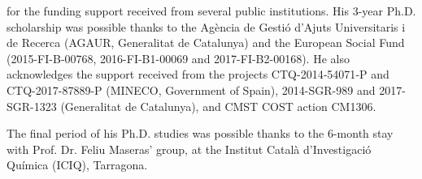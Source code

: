 
 for the funding support received from several public institutions. His 3-year Ph.D. scholarship was possible thanks to the Agència de Gestió d'Ajuts Universitaris i de Recerca (AGAUR, Generalitat de Catalunya) and the European Social Fund (2015-FI-B-00768, 2016-FI-B1-00069 and 2017-FI-B2-00168). He also acknowledges the support received from the projects CTQ-2014‐54071‐P and CTQ-2017-87889-P (MINECO, Government of Spain), 2014-SGR-989 and 2017-SGR-1323 (Generalitat de Catalunya), and CMST COST action CM1306.

The final period of his Ph.D. studies was possible thanks to the 6-month stay with Prof. Dr. Feliu Maseras' group, at the Institut Català d'Investigació Química (ICIQ), Tarragona.

~ \\
